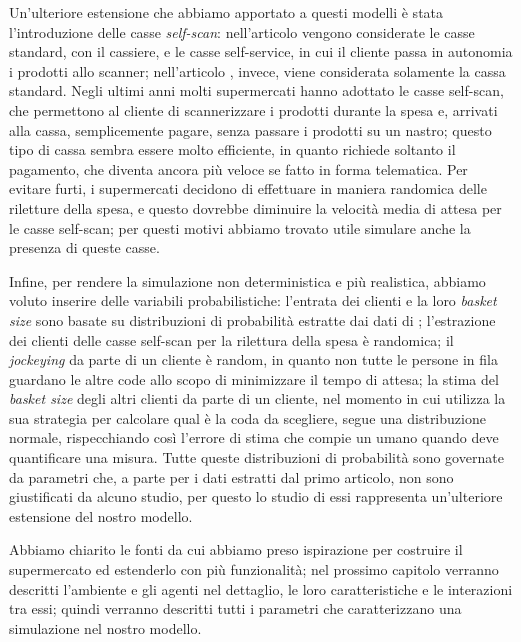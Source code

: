 Un'ulteriore estensione che abbiamo apportato a questi modelli è stata l'introduzione delle casse \textit{self-scan}: nell'articolo \cite{article1} vengono considerate le casse standard, con il cassiere, e le casse self-service, in cui il cliente passa in autonomia i prodotti allo scanner; nell'articolo \cite{yanagisawa2011methods}, invece, viene considerata solamente la cassa standard. Negli ultimi anni molti supermercati hanno adottato le casse self-scan, che permettono al cliente di scannerizzare i prodotti durante la spesa e, arrivati alla cassa, semplicemente pagare, senza passare i prodotti su un nastro; questo tipo di cassa sembra essere molto efficiente, in quanto richiede soltanto il pagamento, che diventa ancora più veloce se fatto in forma telematica. Per evitare furti, i supermercati decidono di effettuare in maniera randomica delle riletture della spesa, e questo dovrebbe diminuire la velocità media di attesa per le casse self-scan; per questi motivi abbiamo trovato utile simulare anche la presenza di queste casse.

Infine, per rendere la simulazione non deterministica e più realistica, abbiamo voluto inserire delle variabili probabilistiche: l'entrata dei clienti e la loro \textit{basket size} sono basate su distribuzioni di probabilità estratte dai dati di \cite{article1}; l'estrazione dei clienti delle casse self-scan per la rilettura della spesa è randomica; il \textit{jockeying} da parte di un cliente è random, in quanto non tutte le persone in fila guardano le altre code allo scopo di minimizzare il tempo di attesa; la stima del \textit{basket size} degli altri clienti da parte di un cliente, nel momento in cui utilizza la sua strategia per calcolare qual è la coda da scegliere, segue una distribuzione normale, rispecchiando così l'errore di stima che compie un umano quando deve quantificare una misura. Tutte queste distribuzioni di probabilità sono governate da parametri che, a parte per i dati estratti dal primo articolo, non sono giustificati da alcuno studio, per questo lo studio di essi rappresenta un'ulteriore estensione del nostro modello.

\vspace*{1\baselineskip}

Abbiamo chiarito le fonti da cui abbiamo preso ispirazione per costruire il supermercato ed estenderlo con più funzionalità; nel prossimo capitolo verranno descritti l'ambiente e gli agenti nel dettaglio, le loro caratteristiche e le interazioni tra essi; quindi verranno descritti tutti i parametri che caratterizzano una simulazione nel nostro modello.